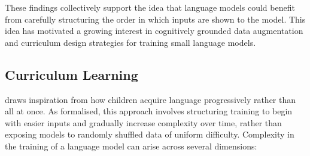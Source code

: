 These findings collectively support the idea that language models could benefit from carefully structuring the order in which inputs are shown to the model. This idea has motivated a growing interest in cognitively grounded data augmentation and curriculum design strategies for training small language models.

\subsection{Curriculum Learning}

 draws inspiration from how children acquire language progressively rather than all at once. As \citet{bengio2009curriculum} formalised, this approach involves structuring training to begin with easier inputs and gradually increase complexity over time, rather than exposing models to randomly shuffled data of uniform difficulty. Complexity in the training of a language model can arise across several dimensions:



